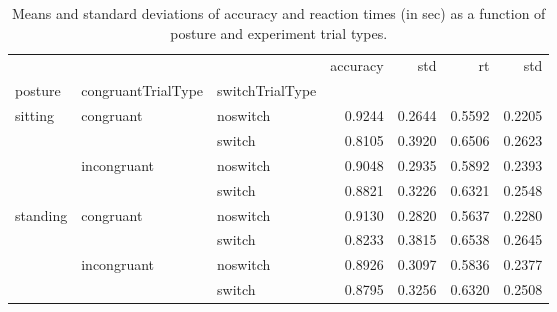\begin{table}
\centering
\caption{Means and standard deviations of accuracy and reaction times (in sec) as a function of posture and experiment trial types.}
\label{table-task-switching-replication-reaction-time}
\begin{tabular}{lllrrrr}
\toprule
         &             &        & accuracy &    std &     rt &    std \\
posture & congruantTrialType & switchTrialType &          &        &        &        \\
\midrule
sitting & congruant & noswitch &   0.9244 & 0.2644 & 0.5592 & 0.2205 \\
         &             & switch &   0.8105 & 0.3920 & 0.6506 & 0.2623 \\
         & incongruant & noswitch &   0.9048 & 0.2935 & 0.5892 & 0.2393 \\
         &             & switch &   0.8821 & 0.3226 & 0.6321 & 0.2548 \\
standing & congruant & noswitch &   0.9130 & 0.2820 & 0.5637 & 0.2280 \\
         &             & switch &   0.8233 & 0.3815 & 0.6538 & 0.2645 \\
         & incongruant & noswitch &   0.8926 & 0.3097 & 0.5836 & 0.2377 \\
         &             & switch &   0.8795 & 0.3256 & 0.6320 & 0.2508 \\
\bottomrule
\end{tabular}
\end{table}
